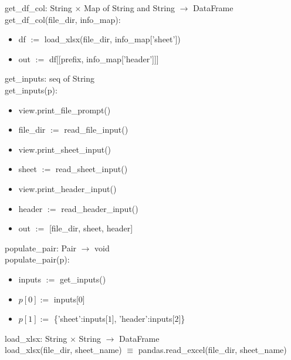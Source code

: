 \documentclass[12pt]{article}
\begin{document}

\noindent get\_df\_col: String $\times$ Map of String and String $\rightarrow$ DataFrame\\
get\_df\_col(file\_dir, info\_map):
\begin{itemize}[\null]
  \item df $:=$ load\_xlsx(file\_dir, info\_map['sheet'])
  \item out $:=$ df[[prefix, info\_map['header']]]
\end{itemize}

\noindent get\_inputs: seq of String\\
get\_inputs(p): 
\begin{itemize}[\null]
  \item view.print\_file\_prompt()
  \item file\_dir $:=$ read\_file\_input()
  \item view.print\_sheet\_input()
  \item sheet $:=$ read\_sheet\_input()
  \item view.print\_header\_input()
  \item header $:=$ read\_header\_input()
  \item out $:=$ [file\_dir, sheet, header]
\end{itemize}

\noindent populate\_pair: Pair $\rightarrow$ void\\
populate\_pair(p): 
\begin{itemize}[\null]
  \item inputs $:=$ get\_inputs()
  \item $p[0] :=$ inputs[$0$]
  \item $p[1] :=$ \{'sheet':inputs[$1$], 'header':inputs[$2$]\}
\end{itemize}

\noindent load\_xlsx: String $\times$ String $\rightarrow$ DataFrame\\
load\_xlsx(file\_dir, sheet\_name) $\equiv$ pandas.read\_excel(file\_dir, sheet\_name)
\end{document}
